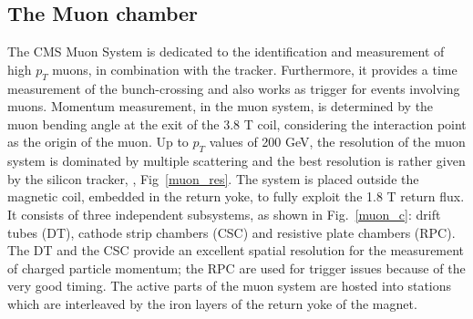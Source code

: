 \subsection*{The Muon chamber}
The CMS Muon System  is dedicated to the identification and measurement of high
$p_T$ muons, in combination with the tracker. Furthermore, it provides a time measurement
of the bunch-crossing and also works as trigger for events involving muons. Momentum
measurement, in the muon system, is determined by the muon bending angle at the exit
of the 3.8 T coil, considering the interaction point as the origin of the muon. Up to $p_T$
values of 200 GeV, the resolution of the muon system is dominated by multiple scattering
and the best resolution is rather given by the silicon tracker, , Fig~\ref{muon_res}. The system is placed outside
the magnetic coil, embedded in the return yoke, to fully exploit the 1.8 T return flux. It
consists of three independent subsystems, as shown in Fig.~\ref{muon_c}: drift tubes (DT), cathode strip chambers (CSC) and resistive plate
chambers (RPC). The DT and the CSC provide an excellent spatial resolution for the
measurement of charged particle momentum; the RPC are used for trigger issues because
of the very good timing. The active parts of the muon system are hosted into stations
which are interleaved by the iron layers of the return yoke of the magnet. 

